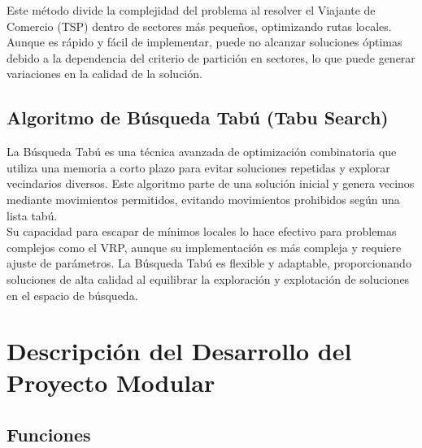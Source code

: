 \documentclass[10pt,twocolumn,letterpaper]{article}
\begin{document}
Este método divide la complejidad del problema al resolver el Viajante de Comercio (TSP) dentro de sectores más pequeños, optimizando rutas locales. Aunque es rápido y fácil de implementar, puede no alcanzar soluciones óptimas debido a la dependencia del criterio de partición en sectores, lo que puede generar variaciones en la calidad de la solución.

\subsection{Algoritmo de Búsqueda Tabú (Tabu Search)}
La Búsqueda Tabú es una técnica avanzada de optimización combinatoria que utiliza una memoria a corto plazo para evitar soluciones repetidas y explorar vecindarios diversos. Este algoritmo parte de una solución inicial y genera vecinos mediante movimientos permitidos, evitando movimientos prohibidos según una lista tabú.\\

Su capacidad para escapar de mínimos locales lo hace efectivo para problemas complejos como el VRP, aunque su implementación es más compleja y requiere ajuste de parámetros. La Búsqueda Tabú es flexible y adaptable, proporcionando soluciones de alta calidad al equilibrar la exploración y explotación de soluciones en el espacio de búsqueda.

\section{Descripción del Desarrollo del Proyecto Modular}

\subsection{Funciones}
\end{document}
